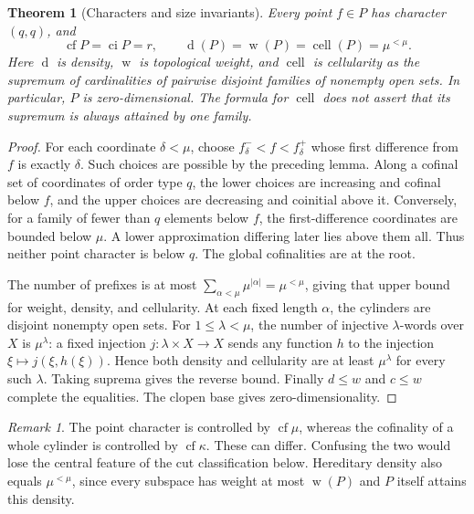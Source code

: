 \documentclass[11pt]{article}
\newtheorem{theorem}{Theorem}[section]
\theoremstyle{definition}
\theoremstyle{remark}
\newtheorem{remark}[remark]{Remark}
\newcommand{\cf}{\operatorname{cf}}
\newcommand{\dens}{\operatorname{d}}
\newcommand{\cell}{\operatorname{cell}}
\newcommand{\weight}{\operatorname{w}}
\newcommand{\ci}{\operatorname{ci}}
\begin{document}
\begin{theorem}[Characters and size invariants]\label{swo:gs:thm:invariants}
Every point $f\in P$ has character $(q,q)$, and
\[\tag{S17.4}\label{swo:gs:eq:invariants}
 \cf P=\ci P=r,\qquad \dens(P)=\weight(P)=\cell(P)=\mu^{<\mu}.
\]
Here $\dens$ is density, $\weight$ is topological weight, and $\cell$ is cellularity
\emph{as the supremum} of cardinalities of pairwise disjoint families of
nonempty open sets. In particular, $P$ is zero-dimensional. The formula
for $\cell$ does not assert that its supremum is always attained by one family.
\end{theorem}
\begin{proof}
For each coordinate $\delta<\mu$, choose $f^-_\delta<f<f^+_\delta$ whose
first difference from $f$ is exactly $\delta$. Such choices are possible
by the preceding lemma. Along a cofinal set of coordinates of order type
$q$, the lower choices are increasing and cofinal below $f$, and the
upper choices are decreasing and coinitial above it. Conversely, for a
family of fewer than $q$ elements below $f$, the first-difference
coordinates are bounded below $\mu$. A lower approximation differing
later lies above them all. Thus neither point character is below $q$.
The global cofinalities are  at the root.

The number of prefixes is at most
$\sum_{\alpha<\mu}\mu^{|\alpha|}=\mu^{<\mu}$, giving that upper bound
for weight, density, and cellularity. At each fixed length $\alpha$, the
cylinders are disjoint nonempty open sets. For $1\le\lambda<\mu$, the
number of injective $\lambda$-words over $X$ is $\mu^\lambda$: a fixed
injection $j:\lambda\times X\to X$ sends any function $h$ to the injection
$\xi\mapsto j(\xi,h(\xi))$. Hence both density and cellularity are at least
$\mu^\lambda$ for every such $\lambda$. Taking suprema gives the reverse
bound. Finally $d\le w$ and $c\le w$ complete the equalities. The clopen
base gives zero-dimensionality.
\end{proof}

\begin{remark}\label{swo:gs:n5.3}
The point character is controlled by $\cf\mu$, whereas the cofinality of
a whole cylinder is controlled by $\cf\kappa$. These can differ.
Confusing the two would lose the central feature of the cut classification
below. Hereditary density also equals $\mu^{<\mu}$, since every subspace
has weight at most $\weight(P)$ and $P$ itself attains this density.
\end{remark}
\end{document}
